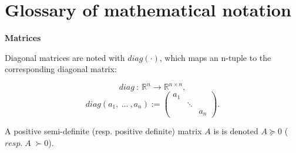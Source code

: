 \section*{Glossary of mathematical notation}

\textbf{Matrices}

Diagonal matrices are noted with $diag(\cdot)$, which maps an n-tuple to the corresponding diagonal matrix:

\begin{equation*}
diag \: : \: \mathbb{R}^{n} \rightarrow \mathbb{R}^{n \times n},
\end{equation*}
\begin{equation*}
diag(a_1,\: ... \:, a_n ) := 
\begin{pmatrix}
    a_{1} & & \\
    & \ddots & \\
    & & a_{n}
  \end{pmatrix}.
  \end{equation*}

A positive semi-definite (resp. positive definite) matrix $A$ is is denoted $A \succeq 0$ ($resp.\; A \; \succ 0$).



 







